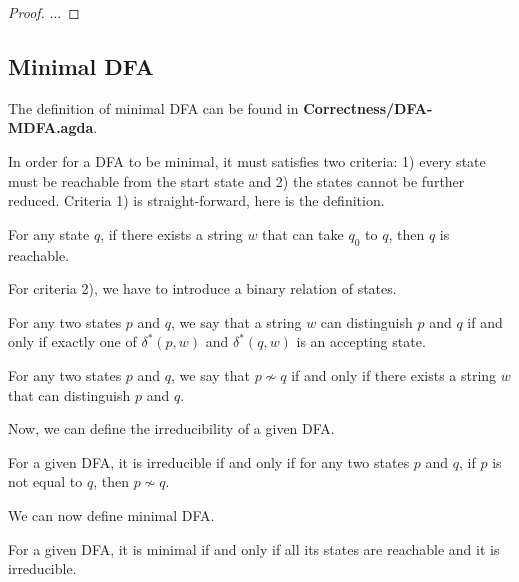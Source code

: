 \begin{proof}
\noindent ...
\end{proof}


\subsection{Minimal DFA}
\par The definition of minimal DFA can be found in
\textbf{Correctness/DFA-MDFA.agda}. 

\par In order for a DFA to be minimal, it must satisfies two criteria:
1) every state must be reachable from the start state and 2) the
states cannot be further reduced. Criteria 1) is straight-forward,
here is the definition. 

\begin{defn}
\noindent For any state \(q\), if there exists a string \(w\) that can
take \(q_0\) to \(q\), then \(q\) is reachable. 
\end{defn} 

\par For criteria 2), we have to introduce a binary relation of states. 

\begin{defn}
\noindent For any two states \(p\) and \(q\), we say that a string
\(w\) can distinguish \(p\) and \(q\) if and only if exactly one of
\(\delta^*(p,w)\) and \(\delta^*(q,w)\) is an accepting state. 
\end{defn}

\begin{defn}
\noindent For any two states \(p\) and \(q\), we say that \(p \nsim
q\) if and only if there exists a string \(w\) that can distinguish
\(p\) and \(q\). 
\end{defn}

\par Now, we can define the irreducibility of a given DFA.

\begin{defn}
\noindent For a given DFA, it is irreducible if and only if for any
two states \(p\) and \(q\), if \(p\) is not equal to \(q\), then \(p \nsim q\). 
\end{defn}

\par We can now define minimal DFA.

\begin{defn}
\noindent For a given DFA, it is minimal if and only if all its states
are reachable and it is irreducible. 
\end{defn}

